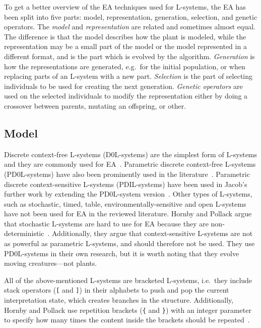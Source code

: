 To get a better overview of the \gls{EA} techniques used for \glspl{L-system}, the \gls{EA} has been split into five parts: model, representation, generation, selection, and genetic operators.
The \textit{model} and \textit{representation} are related and sometimes almost equal.
The difference is that the model describes how the plant is modeled, while the representation may be a small part of the model or the model represented in a different format, and is the part which is evolved by the algorithm.
\textit{Generation} is how the representations are generated, e.g.\ for the initial population, or when replacing parts of an \gls{L-system} with a new part.
\textit{Selection} is the part of selecting individuals to be used for creating the next generation.
\textit{Genetic operators} are used on the selected individuals to modify the representation either by doing a crossover between parents, mutating an offspring, or other.

\subsection{Model}
Discrete context-free \glspl{L-system} (D0L-systems) are the simplest form of \glspl{L-system} and they are commonly used for \gls{EA}~\cite{1998Mock,1998Ochoa,2002Ebner,2003Ebner,2006Ashlock,2009Beaumont,2009Corchado}.
Parametric discrete context-free \glspl{L-system} (PD0L-systems) have also been prominently used in the literature~\cite{1994Jacob,2000Vanak,2001Hornby}.
Parametric discrete context-sensitive \glspl{L-system} (PDIL-systems) have been used in Jacob's further work by extending the PD0L-system version~\cite{1995Jacob, 1996Jacob, 1996Jacob-2}.
Other types of \glspl{L-system}, such as stochastic, timed, table, environmentally-sensitive and open \glspl{L-system} have not been used for \gls{EA} in the reviewed literature.
Hornby and Pollack argue that stochastic \glspl{L-system} are hard to use for \gls{EA} because they are non-deterministic~\cite{2001Hornby}.
Additionally, they argue that context-sensitive \glspl{L-system} are not as powerful as parametric \glspl{L-system}, and should therefore not be used.
They use PD0L-systems in their own research, but it is worth noting that they evolve moving creatures---not plants.

All of the above-mentioned \glspl{L-system} are bracketed \glspl{L-system}, i.e.\ they include stack operators (\texttt{[} and \texttt{]}) in their alphabets to push and pop the current interpretation state, which creates branches in the structure.
Additionally, Hornby and Pollack use repetition brackets (\texttt{\{} and \texttt{\}}) with an integer parameter to specify how many times the content inside the brackets should be repeated~\cite{2001Hornby}.

